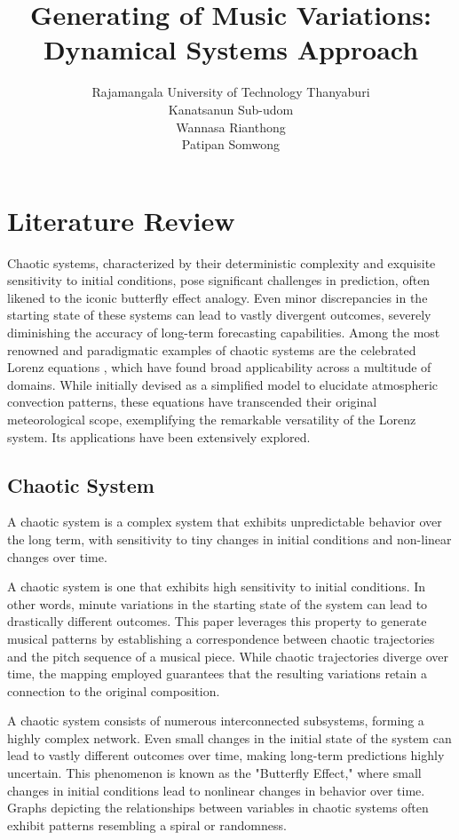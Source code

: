 \documentclass[11pt]{article}
\title{Generating of Music Variations: Dynamical Systems Approach}
\author{Rajamangala University of Technology Thanyaburi\\Kanatsanun Sub-udom\\Wannasa Rianthong\\Patipan Somwong}
\begin{document}
\maketitle
\section{Literature Review}
Chaotic systems, characterized by their deterministic complexity and exquisite sensitivity to initial conditions, pose significant challenges in prediction, often likened to the iconic butterfly effect analogy. Even minor discrepancies in the starting state of these systems can lead to vastly divergent outcomes, severely diminishing the accuracy of long-term forecasting capabilities. Among the most renowned and paradigmatic examples of chaotic systems are the celebrated Lorenz equations \cite{noauthor_lorenz_nodate}, which have found broad applicability across a multitude of domains. While initially devised as a simplified model to elucidate atmospheric convection patterns, these equations have transcended their original meteorological scope, exemplifying the remarkable versatility of the Lorenz system. Its applications have been extensively explored.
\subsection{Chaotic System}
A chaotic system is a complex system that exhibits unpredictable behavior over the long term, with sensitivity to tiny changes in initial conditions and non-linear changes over time.


A chaotic system is one that exhibits high sensitivity to initial conditions. In other words, minute variations in the starting state of the system can lead to drastically different outcomes. This paper leverages this property to generate musical patterns by establishing a correspondence between chaotic trajectories and the pitch sequence of a musical piece. While chaotic trajectories diverge over time, the mapping employed guarantees that the resulting variations retain a connection to the original composition.

A chaotic system consists of numerous interconnected subsystems, forming a highly complex network. Even small changes in the initial state of the system can lead to vastly different outcomes over time, making long-term predictions highly uncertain. This phenomenon is known as the "Butterfly Effect," where small changes in initial conditions lead to nonlinear changes in behavior over time. Graphs depicting the relationships between variables in chaotic systems often exhibit patterns resembling a spiral or randomness.
\end{document}
